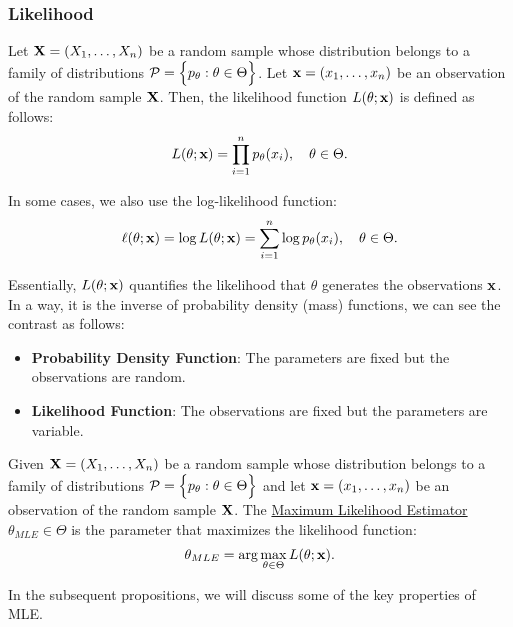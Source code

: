 \subsubsection{Likelihood}
\begin{definition}
    Let ${\bf X}=(X_1, \dots, X_n)$ be a random sample whose distribution belongs to a family of distributions $\mathcal{P}=\Big\{ p_\theta:\theta\in\Theta \Big\}$. Let ${\bf x}=(x_1, \dots, x_n)$ be an observation of the random sample ${\bf X}$. Then, the likelihood function $L(\theta;{\bf x})$ is defined as follows:
    \begin{equation}
        L(\theta;{\bf x}) = \prod_{i=1}^n p_\theta(x_i), \quad \theta\in\Theta.
    \end{equation}

    \noindent In some cases, we also use the log-likelihood function:
    \begin{equation}
        \ell(\theta;{\bf x}) = \log L(\theta;{\bf x}) = \sum_{i=1}^n \log p_\theta(x_i), \quad \theta\in\Theta.
    \end{equation}

    \noindent Essentially, $L(\theta;{\bf x})$ quantifies the likelihood that $\theta$ generates the observations ${\bf x}$. In a way, it is the inverse of probability density (mass) functions, we can see the contrast as follows:
    \begin{itemize}
        \item \textbf{Probability Density Function}: The parameters are fixed but the observations are random.
        \item \textbf{Likelihood Function}: The observations are fixed but the parameters are variable.
    \end{itemize} 
\end{definition}

\begin{definition}
    Given ${\bf X}=(X_1, \dots, X_n)$ be a random sample whose distribution belongs to a family of distributions $\mathcal{P}=\Big\{ p_\theta:\theta\in\Theta \Big\}$ and let ${\bf x}=(x_1, \dots, x_n)$ be an observation of the random sample ${\bf X}$. The \underline{Maximum Likelihood Estimator} $\theta_{MLE}\in\Theta$ is the parameter that maximizes the likelihood function:
    \begin{equation}
        \theta_{MLE} = \arg\max_{\theta\in\Theta} L(\theta;{\bf x}).
    \end{equation}

    \noindent In the subsequent propositions, we will discuss some of the key properties of MLE.
\end{definition} 


